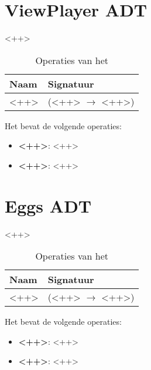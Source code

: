 \section{View\textunderscore Player ADT}
\label{section:view_ant}

<++>

\begin{table}[hbt]
\centering
\begin{tabular}{|ll|}
\hline
\rowcolor[HTML]{000000} 
{\color[HTML]{FFFFFF} \textbf{Naam}} & {\color[HTML]{FFFFFF} \textbf{Signatuur}} \\ \hline
<++>                                 & (<++> $\rightarrow$ <++>)                                       \\ \hline
\end{tabular}
\caption{Operaties van het \texttt{}}
\label{table:view_ant}
\end{table}

Het \texttt{} bevat de volgende operaties:

\begin{itemize}
	\item \textbf{<++>}: <++>
	\item \textbf{<++>}: <++>
\end{itemize}

\section{Eggs ADT}
\label{section:eggs}

<++>

\begin{table}[hbt]
\centering
\begin{tabular}{|ll|}
\hline
\rowcolor[HTML]{000000} 
{\color[HTML]{FFFFFF} \textbf{Naam}} & {\color[HTML]{FFFFFF} \textbf{Signatuur}} \\ \hline
<++>                                 & (<++> $\rightarrow$ <++>)                                       \\ \hline
\end{tabular}
\caption{Operaties van het \texttt{}}
\label{table:eggs}
\end{table}

Het \texttt{} bevat de volgende operaties:

\begin{itemize}
	\item \textbf{<++>}: <++>
	\item \textbf{<++>}: <++>
\end{itemize}

